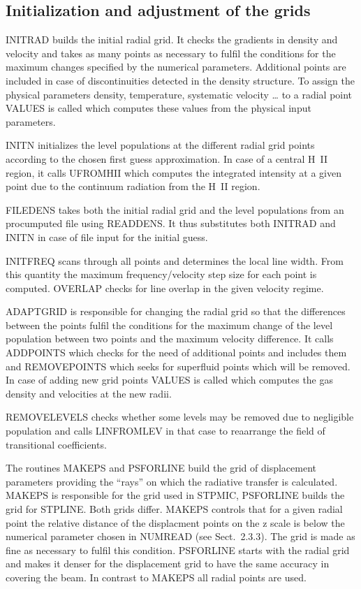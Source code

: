 \subsection{Initialization and adjustment of the grids}

INITRAD builds the initial radial grid. It checks the gradients in density 
and velocity and takes as many points as necessary to fulfil the
conditions for the maximum changes specified by the numerical 
parameters. Additional points are included in case of discontinuities
detected in the density structure. To assign the physical parameters
density, temperature, systematic velocity \dots{} to a radial point
VALUES is called which computes these values from the physical input
parameters.

INITN initializes the level populations at the different radial grid
points according to the chosen first guess approximation. In case of
a central H~II region, it calls UFROMHII which computes the integrated
intensity at a given point due to the continuum radiation from
the H~II region.

FILEDENS takes both the initial radial grid and the level populations
from an procumputed file using READDENS. It thus substitutes both 
INITRAD and INITN in case of file input for the initial guess.

INITFREQ scans through all points and determines the local
line width. From this quantity the maximum frequency/velocity step
size for each point is computed. OVERLAP checks for line overlap
in the given velocity regime.

ADAPTGRID is responsible for changing the radial grid so that
the differences between the points fulfil the conditions for
the maximum change of the level population between two points and the
maximum velocity difference. It calls ADDPOINTS which checks for the need
of additional points and includes them and REMOVEPOINTS which
seeks for superfluid points which will be removed. In case of adding
new grid points VALUES is called which computes the gas density and
velocities at the new radii.

REMOVELEVELS checks whether some levels may be removed due to
negligible population and calls LINFROMLEV in that case to
reaarrange the field of transitional coefficients.

The routines MAKEPS and PSFORLINE build the grid of displacement 
parameters providing the ``rays'' on which the radiative transfer is 
calculated. MAKEPS is responsible for the grid used in STPMIC,
PSFORLINE builds the grid for STPLINE. Both grids differ.
MAKEPS controls that for a given radial point the relative distance
of the displacment points on the z scale is below the 
numerical parameter chosen in NUMREAD (see Sect.\ 2.3.3). 
The grid is made as fine as necessary to fulfil this condition.
PSFORLINE starts with the radial grid and makes it denser for
the displacement grid to have the same accuracy in covering the beam.
In contrast to MAKEPS all radial points are used.


